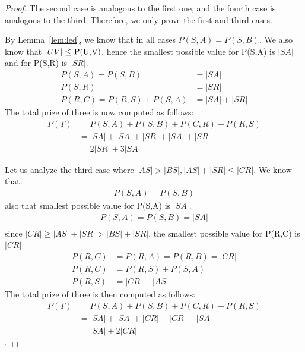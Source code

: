 \documentclass[openany]{book}
\newcommand{\Price}[2]{P(#1,#2)}
\newcommand{\Ptotal}[1]{P(#1)}
\begin{document}
	\begin{proof}
		The second case is analogous to the first one, and the fourth case is analogous to the third. Therefore, we only prove the first and third cases.
		
		By Lemma~\ref{lem:led}, we know that in all cases \( \Price{S}{A} = \Price{S}{B} \).
		We also know that \( |UV| \leq  $ \Price{U}{V}$ \), hence the smallest possible value for \Price{S}{A} is \(|SA|\) and for \Price{S}{R} is \(|SR|\).
		\begin{align*}	
			\Price{S}{A} = \Price{S}{B} &= |SA| \\
			\Price{S}{R} &= |SR| \\
			\Price{R}{C} = \Price{R}{S} + \Price{S}{A} &= |SA| + |SR|
		\end{align*}
		The total prize of three is now computed as follows:
		\begin{align*}	
			\Ptotal{T} &= \Price{S}{A} + \Price{S}{B} + \Price{C}{R} + \Price{R}{S} \\
			&= |SA| + |SA| + |SR| + |SA| + |SR| \\
			&= 2 |SR| + 3 |SA|
		\end{align*}
		
		Let us analyze the third case where \( |AS| > |BS|, |AS|+|SR| \leq |CR| \).
		We know that:
		\begin{align*}
			\Price{S}{A} = \Price{S}{B}
		\end{align*}
		also that smallest possible value for \Price{S}{A} is \(|SA|\).
		\begin{align*}	
			\Price{S}{A} = \Price{S}{B} = |SA| \\
		\end{align*}
		since \(|CR| \geq |AS|+|SR| > |BS|+|SR| \), the smallest possible value for \Price{R}{C} is \(|CR|\)
		\begin{align*}
			\Price{R}{C} &= \Price{R}{A} = \Price{R}{B} = |CR| \\
			\Price{R}{C} &= \Price{R}{S} + \Price{S}{A} \\
			\Price{R}{S} &= |CR| - |AS|
		\end{align*}
		The total prize of three is then computed as follows:
		\begin{align*}	
			\Ptotal{T} &= \Price{S}{A} + \Price{S}{B} + \Price{C}{R} + \Price{R}{S} \\
			&= |SA| + |SA| + |CR| + |CR| - |SA| \\
			&= |SA| + 2 |CR|
		\end{align*}
	\hfill $\square$
	\end{proof}	 
	
\end{document}
